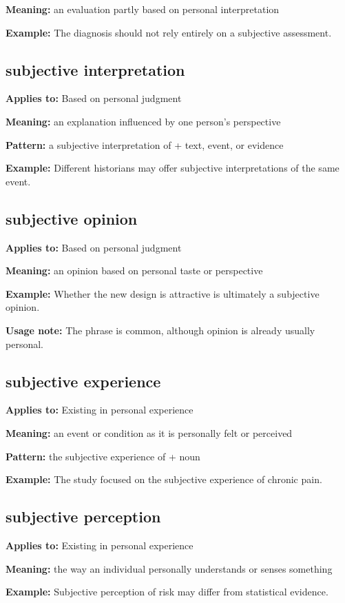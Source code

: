\documentclass[11pt]{article}
\begin{document}
\textbf{Meaning:} an evaluation partly based on personal interpretation

\textbf{Example:} The diagnosis should not rely entirely on a subjective assessment.

\subsection{subjective interpretation}
\textbf{Applies to:} Based on personal judgment

\textbf{Meaning:} an explanation influenced by one person's perspective

\textbf{Pattern:} a subjective interpretation of + text, event, or evidence

\textbf{Example:} Different historians may offer subjective interpretations of the same event.

\subsection{subjective opinion}
\textbf{Applies to:} Based on personal judgment

\textbf{Meaning:} an opinion based on personal taste or perspective

\textbf{Example:} Whether the new design is attractive is ultimately a subjective opinion.

\textbf{Usage note:} The phrase is common, although opinion is already usually personal.

\subsection{subjective experience}
\textbf{Applies to:} Existing in personal experience

\textbf{Meaning:} an event or condition as it is personally felt or perceived

\textbf{Pattern:} the subjective experience of + noun

\textbf{Example:} The study focused on the subjective experience of chronic pain.

\subsection{subjective perception}
\textbf{Applies to:} Existing in personal experience

\textbf{Meaning:} the way an individual personally understands or senses something

\textbf{Example:} Subjective perception of risk may differ from statistical evidence.
\end{document}
